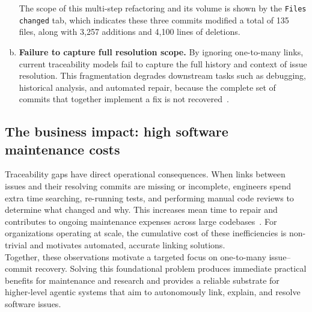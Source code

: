 \begin{enumerate}[a)]
    The scope of this multi-step refactoring and its volume is shown by the \texttt{Files changed} tab, which indicates these three commits modified a total of 135 files, along with 3,257 additions and 4,100 lines of deletions.

	\item \textbf{Failure to capture full resolution scope.} By ignoring one-to-many links, current traceability models fail to capture the full history and context of issue resolution. This fragmentation degrades downstream tasks such as debugging, historical analysis, and automated repair, because the complete set of commits that together implement a fix is not recovered~\cite{r6}.
\end{enumerate}


\subsection{The business impact: high software maintenance costs}

Traceability gaps have direct operational consequences. When links between issues and their resolving commits are missing or incomplete, engineers spend extra time searching, re-running tests, and performing manual code reviews to determine what changed and why. This increases mean time to repair and contributes to ongoing maintenance expenses across large codebases~\cite{r15,r16}. For organizations operating at scale, the cumulative cost of these inefficiencies is non-trivial and motivates automated, accurate linking solutions.\\

\noindent
Together, these observations motivate a targeted focus on one-to-many issue–commit recovery. Solving this foundational problem produces immediate practical benefits for maintenance and research and provides a reliable substrate for higher-level agentic systems that aim to autonomously link, explain, and resolve software issues.

